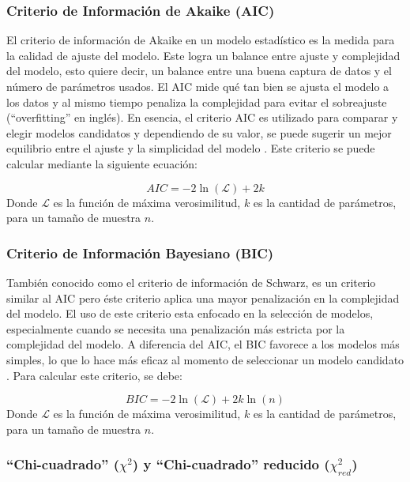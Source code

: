 \subsubsection{ Criterio de Información de Akaike (AIC)}\label{aiclabel}

El criterio de información de Akaike en un modelo estadístico es la medida para la calidad de ajuste del modelo. Este logra un balance entre ajuste y complejidad del modelo, esto quiere decir, un balance entre una buena captura de datos y el número de parámetros usados. El AIC mide qué tan bien se ajusta el modelo a los datos y al mismo tiempo penaliza la complejidad para evitar el sobreajuste (``overfitting'' en inglés). En esencia, el criterio AIC es utilizado para comparar y elegir modelos candidatos y dependiendo de su valor, se puede sugerir un mejor equilibrio entre el ajuste y la simplicidad del modelo \cite{aicbicdata}. Este criterio se puede calcular mediante la siguiente ecuación:

\begin{equation}
    AIC = -2\ln(\mathcal{L})+2k
\end{equation}
Donde $\mathcal{L}$ es la función de máxima verosimilitud, $k$ es la cantidad de parámetros, para un tamaño de muestra $n$.

\subsubsection{Criterio de Información Bayesiano (BIC)}\label{biclabel}

También conocido como el criterio de información de Schwarz, es un criterio similar al AIC pero éste criterio aplica una mayor penalización en la complejidad del modelo. El uso de este criterio esta enfocado en la selección de modelos, especialmente cuando se necesita  una penalización más estricta por la complejidad del modelo. A diferencia del AIC, el BIC favorece a los modelos más simples, lo que lo hace más eficaz al momento de seleccionar un modelo candidato \cite{aicbicdata}. Para calcular este criterio, se debe:

\begin{equation}
    BIC = -2\ln(\mathcal{L})+2k\ln(n)
\end{equation}
Donde $\mathcal{L}$ es la función de máxima verosimilitud, $k$ es la cantidad de parámetros, para un tamaño de muestra $n$.


\subsubsection{``Chi-cuadrado'' ($\chi^{2}$) y ``Chi-cuadrado'' reducido ($\chi^{2}_{red}$)}

